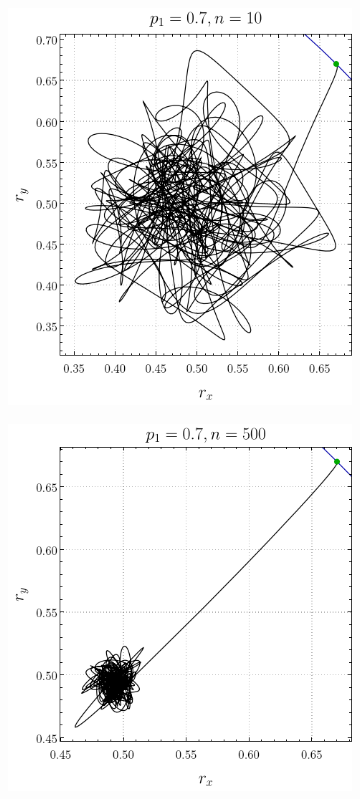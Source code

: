 \begin{figure}[ht!]
    \centering
    \begin{subfigure}{0.5\textwidth}
      \centering
      \includegraphics[width=0.9\linewidth]{chapter3/figures_separable/local_prefinv_ran_n=10_p=0.7_r=0.95_a=-3_b=3.png}
    \end{subfigure}%
    \begin{subfigure}{0.5\textwidth}
      \centering
      \includegraphics[width=0.9\linewidth]{chapter3/figures_separable/local_prefinv_ran_n=500_p=0.7_r=0.95_a=-3_b=3.png}

\end{subfigure}
\end{figure}
